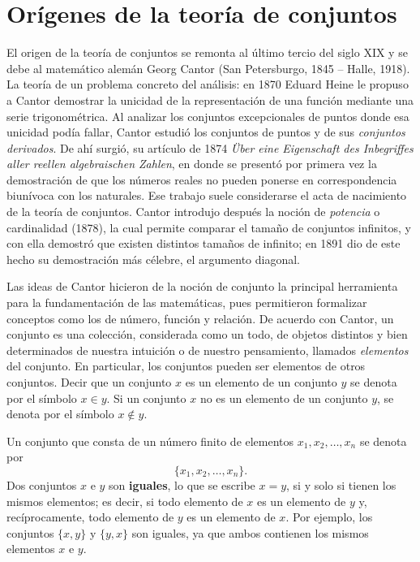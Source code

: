 
\chapter{Orígenes de la teoría de conjuntos}

El origen de la teoría de conjuntos se remonta al último tercio del siglo XIX y se debe al matemático alemán Georg
Cantor (San Petersburgo, 1845 -- Halle, 1918). La teoría de un problema concreto del análisis: en 1870 Eduard Heine le
propuso a Cantor demostrar la unicidad de la representación de una función mediante una serie trigonométrica. Al
analizar los conjuntos excepcionales de puntos donde esa unicidad podía fallar, Cantor estudió los conjuntos de puntos
y de sus \emph{conjuntos derivados}. De ahí surgió, su artículo de 1874 \emph{Über eine Eigenschaft des Inbegriffes
    aller reellen algebraischen Zahlen}, en donde se presentó por primera vez la demostración de que los números reales no
pueden ponerse en correspondencia biunívoca con los naturales. Ese trabajo suele considerarse el acta de nacimiento de
la teoría de conjuntos. Cantor introdujo después la noción de \emph{potencia} o cardinalidad (1878), la cual permite
comparar el tamaño de conjuntos infinitos, y con ella demostró que existen distintos tamaños de infinito; en 1891 dio
de este hecho su demostración más célebre, el argumento diagonal.

Las ideas de Cantor hicieron de la noción de conjunto la principal herramienta para la fundamentación de las
matemáticas, pues permitieron formalizar conceptos como los de número, función y relación. De acuerdo con Cantor, un
conjunto es una colección, considerada como un todo, de objetos distintos y bien determinados de nuestra intuición o de
nuestro pensamiento, llamados \emph{elementos} del conjunto. En particular, los conjuntos pueden ser elementos de otros
conjuntos. Decir que un conjunto $x$ es un elemento de un conjunto $y$ se denota por el símbolo $x\in y$. Si un
conjunto $x$ no es un elemento de un conjunto $y$, se denota por el símbolo $x\notin y$.

Un conjunto que consta de un número finito de elementos $x_{1}, x_{2}, \ldots, x_{n}$ se denota por
\[
    \{x_{1}, x_{2}, \ldots, x_{n}\}.
\]
Dos conjuntos $x$ e $y$ son \textbf{iguales}, lo que se escribe $x = y$, si y solo si
tienen los mismos elementos; es decir, si todo elemento de $x$ es un elemento de $y$ y, recíprocamente, todo elemento
de $y$ es un elemento de $x$. Por ejemplo, los conjuntos $\{x, y\}$ y $\{y, x\}$ son iguales, ya que ambos contienen
los mismos elementos $x$ e $y$.

